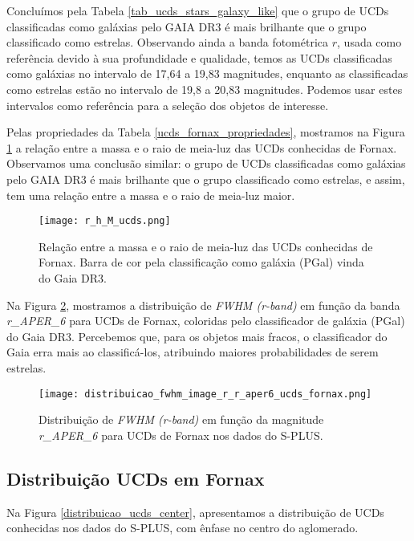 Concluímos pela Tabela \ref{tab_ucds_stars_galaxy_like} que o grupo de UCDs classificadas como galáxias pelo GAIA DR3 é mais brilhante que o grupo classificado como estrelas. Observando ainda a banda fotométrica $r$, usada como referência devido à sua profundidade e qualidade, temos as UCDs classificadas como galáxias no intervalo de 17,64 a 19,83 magnitudes, enquanto as classificadas como estrelas estão no intervalo de 19,8 a 20,83 magnitudes. Podemos usar estes intervalos como referência para a seleção dos objetos de interesse.

Pelas propriedades da Tabela \ref{ucds_fornax_propriedades}, mostramos na Figura \ref{r_h_M_ucds} a relação entre a massa e o raio de meia-luz das UCDs conhecidas de Fornax. Observamos uma conclusão similar: o grupo de UCDs classificadas como galáxias pelo GAIA DR3 é mais brilhante que o grupo classificado como estrelas, e assim, tem uma relação entre a massa e o raio de meia-luz maior.

\begin{figure}[!ht]
    \centering
    \texttt{[image: r\_h\_M\_ucds.png]} 
    \caption[]{Relação entre a massa e o raio de meia-luz das UCDs conhecidas de Fornax. Barra de cor pela classificação como galáxia (PGal) vinda do Gaia DR3.}
    \label{r_h_M_ucds}
\end{figure}

Na Figura \ref{distribuicao_fwhm_image_r_r_aper6_ucds_fornax}, mostramos a distribuição de \textit{FWHM (r-band)} em função da banda \textit{r\_APER\_6} para UCDs de Fornax, coloridas pelo classificador de galáxia (PGal) do Gaia DR3. Percebemos que, para os objetos mais fracos, o classificador do Gaia erra mais ao classificá-los, atribuindo maiores probabilidades de serem estrelas.

\begin{figure}[!ht]
    \centering
    \texttt{[image: distribuicao\_fwhm\_image\_r\_r\_aper6\_ucds\_fornax.png]}
    \caption[]{Distribuição de \textit{FWHM (r-band)} em função da magnitude \textit{r\_APER\_6} para UCDs de Fornax nos dados do S-PLUS.}
    \label{distribuicao_fwhm_image_r_r_aper6_ucds_fornax}
\end{figure}


\subsection*{Distribuição UCDs em Fornax}
Na Figura \ref{distribuicao_ucds_center}, apresentamos a distribuição de UCDs conhecidas nos dados do S-PLUS, com ênfase no centro do aglomerado.


